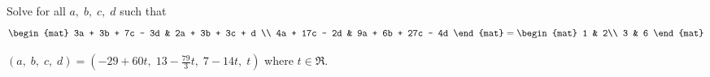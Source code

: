 
\begin{Exercise}[
name={},
title={}, 
difficulty=0,
origin={\cite{YL}}]
Solve for all $a,\;b,\;c,\;d$ such that
\[
\begin{mat}
3a  +  3b  +  7c - 3d &
2a  +  3b  +  3c + d \\
4a  +  17c -  2d  &
9a  +  6b  +  27c - 4d 
\end{mat}
=
\begin{mat}
1 & 2\\
3 & 6
\end{mat}
\]
\end{Exercise}

\begin{Answer}
$(a,\;b,\;c,\;d)=(-29+60t,\; 13-\frac{79}{3}t,\; 7-14t,\;t)$ where $t\in\Re$.
\end{Answer}
